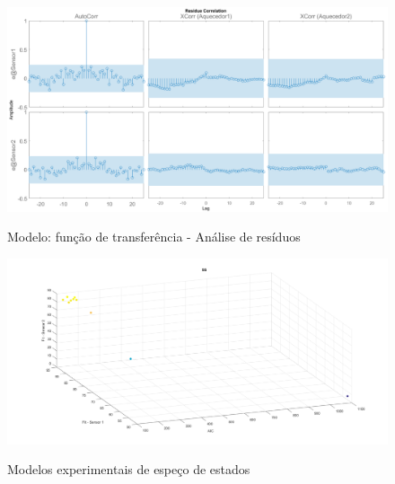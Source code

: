 \begin{apendicesenv}
\begin{figure}
	\caption{Modelo: função de transferência - Análise de resíduos}
	\begin{center}
		\includegraphics[width=1.00\textwidth]{./5_images/tclabsp-models-TF-resid.png} 
		\label{fig:tclabsp-models-tf-resid}
	\end{center}
	\centering
\end{figure}

\begin{figure}[h]
	\caption{Modelos experimentais de espeço de estados}
	\begin{center}
		\includegraphics[width=1.00\textwidth]{./5_images/tclabsp-models-SS.png} 
		\label{fig:tclabsp-models-ss}
	\end{center}
	\centering
\end{figure}


\end{apendicesenv}
